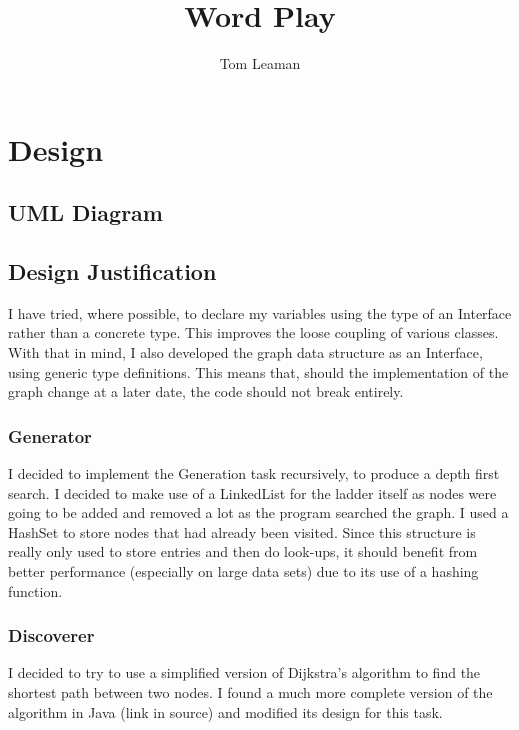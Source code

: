 \documentclass[12pt, titlepage, a4paper, twoside]{article}
\title{Word Play}
\author{Tom Leaman}
\begin{document}
\maketitle

\section*{Design}

\subsection*{UML Diagram}

\subsection*{Design Justification}
I have tried, where possible, to declare my variables using the type of an
Interface rather than a concrete type. This improves the loose coupling of
various classes.
With that in mind, I also developed the graph data structure as an Interface,
using generic type definitions. This means that, should the implementation of
the graph change at a later date, the code should not break entirely.

\subsubsection*{Generator}
I decided to implement the Generation task recursively, to produce a depth
first search. I decided to make use of a LinkedList for the ladder itself as
nodes were going to be added and removed a lot as the program searched the graph.
I used a HashSet to store nodes that had already been visited. Since this structure
is really only used to store entries and then do look-ups, it should benefit
from better performance (especially on large data sets) due to its use of
a hashing function.

\subsubsection*{Discoverer}
I decided to try to use a simplified version of Dijkstra's algorithm to find
the shortest path between two nodes. I found a much more complete version of
the algorithm in Java (link in source) and modified its design for this task.
\end{document}
